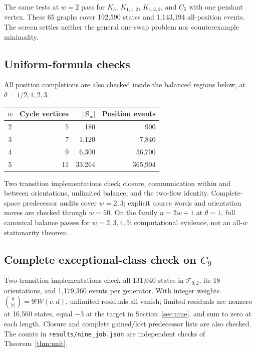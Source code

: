 \documentclass[11pt]{article}
\theoremstyle{remark}
\newcommand{\B}{\mathcal B_w}
\begin{document}
The same tests at $w=2$ pass for $K_3$, $K_{1,1,2}$, $K_{1,2,2}$, and $C_5$ with one pendant vertex. These 65 graphs cover 192,590 states and 1,143,194 all-position events. The screen settles neither the general one-swap problem nor counterexample minimality.

\subsection{Uniform-formula checks}\label{sec:uniform-checks}
All position completions are also checked inside the balanced regions below, at $\theta=1/2,1,2,3$.
\begin{center}
\begin{tabular}{crrr}
\toprule
$w$ & Cycle vertices & $|\B|$ & Position events\\
\midrule
2&5&180&900\\
3&7&1,120&7,840\\
4&9&6,300&56,700\\
5&11&33,264&365,904\\
\bottomrule
\end{tabular}
\end{center}
Two transition implementations check closure, communication within and between orientations, unlimited balance, and the two-flow identity. Complete-space predecessor audits cover $w=2,3$; explicit source words and orientation moves are checked through $w=50$. On the family $n=2w+1$ at $\theta=1$, full canonical balance passes for $w=2,3,4,5$: computational evidence, not an all-$w$ stationarity theorem.


\subsection{Complete exceptional-class check on \texorpdfstring{$C_9$}{C9}}
Two transition implementations check all 131,040 states in $\mathcal T_{9,2}$, its 18 orientations, and 1,179,360 events per generator. With integer weights $\binom9{|c|}=9!W(c,d)$, unlimited residuals all vanish; limited residuals are nonzero at 16,560 states, equal $-3$ at the target in Section~\ref{sec:nine}, and sum to zero at each length. Closure and complete gained/lost predecessor lists are also checked. The counts in \texttt{results/nine\_job.json} are independent checks of Theorem~\ref{thm:unit}.
\end{document}

